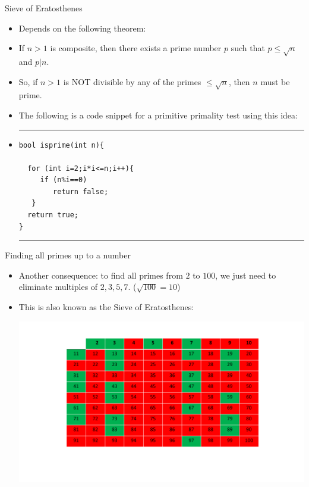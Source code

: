 \documentclass[ %
 usenames,dvipsnames,
aspectratio=169,11pt ]{beamer}
\newenvironment{stepitemize}{\begin{itemize}[<+->]}{\end{itemize} }
\begin{document}
\begin{frame}[fragile]{Sieve of Eratosthenes}
\begin{stepitemize}
\item Depends on the following theorem:
\item If $n>1$ is composite, then there exists a prime number $p$ such that $p\leq \sqrt{n}$ and $p|n$.
\item So, if $n>1$ is NOT divisible by any of the primes $\leq \sqrt{n}$, then $n$ must be prime.
\item The following is a code snippet for a primitive primality test using this idea:

\item[] \rule{\textwidth}{1pt}
\begin{verbatim}
bool isprime(int n){

  for (int i=2;i*i<=n;i++){
     if (n%i==0)
        return false;
   }
  return true;
}
\end{verbatim}
\rule{\textwidth}{1pt}
\end{stepitemize}

\end{frame}

\begin{frame}{Finding all primes up to a number}
\begin{stepitemize}
\item Another consequence: to find all primes from $2$ to $100$, we just need to eliminate multiples of $2,3,5,7$. ($\sqrt{100}=10$)
\item This is also known as the Sieve of Eratosthenes:

\bigskip

\begin{center}
    \includegraphics[scale=.40]{images/erat.pdf}
\end{center}

\end{stepitemize}
\end{frame}
\end{document}
